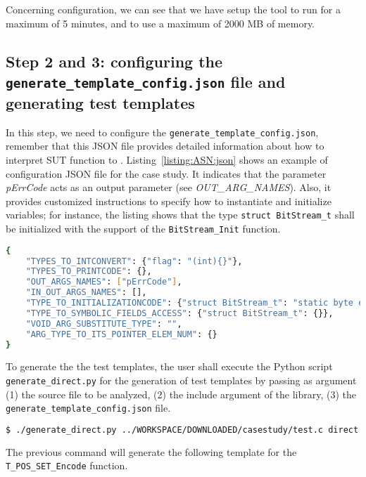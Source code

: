 Concerning \SEMU configuration, we can see that we have setup the tool to run for a maximum of 5 minutes, and to use a maximum of 2000 MB of memory.

\subsection{Step 2 and 3: configuring the \texttt{generate\_template\_config.json} file and generating test templates}

In this step, we need to configure the \texttt{generate\_template\_config.json}, remember that this JSON file provides detailed information about how to interpret SUT function to \SEMUS.
Listing~\ref{listing:ASN:json} shows an example of configuration JSON file for the case study. 
It indicates that the parameter \emph{pErrCode} acts as an output parameter (see \emph{OUT\_ARG\_NAMES}). 
Also, it provides customized instructions to specify how to instantiate and initialize variables; for instance, the listing shows that the type \texttt{struct BitStream\_t} shall be initialized with the support of the \texttt{BitStream\_Init} function.

\begin{lstlisting}[language=bash,label=listing:ASN:json,caption=JSON configuration file for ASN.1.]
{
    "TYPES_TO_INTCONVERT": {"flag": "(int){}"},
    "TYPES_TO_PRINTCODE": {},
    "OUT_ARGS_NAMES": ["pErrCode"],
    "IN_OUT_ARGS_NAMES": [],
    "TYPE_TO_INITIALIZATIONCODE": {"struct BitStream_t": "static byte encBuff[T_POS_SET_REQUIRED_BYTES_FOR_ENCODING + 1];\n\tBitStream_Init(&{}, encBuff, T_POS_SET_REQUIRED_BYTES_FOR_ENCODING)"},
    "TYPE_TO_SYMBOLIC_FIELDS_ACCESS": {"struct BitStream_t": {}},
    "VOID_ARG_SUBSTITUTE_TYPE": "",
    "ARG_TYPE_TO_ITS_POINTER_ELEM_NUM": {}
}
\end{lstlisting}

To generate the the test templates, the user shall execute the Python script \texttt{generate\_direct.py} for the generation of test templates by passing as argument (1) the source file to be analyzed, (2) the include argument of the library, (3) the \texttt{generate\_template\_config.json} file.

\begin{lstlisting}[language=bash]
$ ./generate_direct.py ../WORKSPACE/DOWNLOADED/casestudy/test.c direct " -I../WORKSPACE/DOWNLOADED/casestudy/" -c generate_template_config.json
\end{lstlisting}

The previous command will generate the following template for the \texttt{T\_POS\_SET\_Encode} function.

